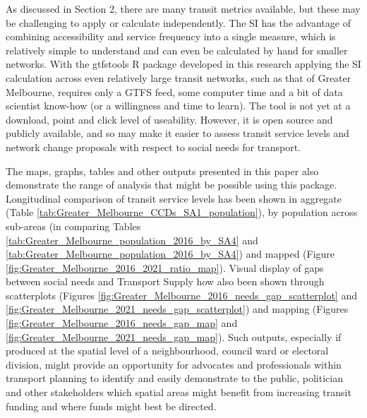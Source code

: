 \documentclass[preprint, 3p,
authoryear]{elsarticle} %
\begin{document}
As discussed in Section 2, there are many transit metrics available, but
these may be challenging to apply or calculate independently. The SI has
the advantage of combining accessibility and service frequency into a
single measure, which is relatively simple to understand and can even be
calculated by hand for smaller networks. With the gtfstools R package
developed in this research applying the SI calculation across even
relatively large transit networks, such as that of Greater Melbourne,
requires only a GTFS feed, some computer time and a bit of data
scientist know-how (or a willingness and time to learn). The tool is not
yet at a download, point and click level of useability. However, it is
open source and publicly available, and so may make it easier to assess
transit service levels and network change proposals with respect to
social needs for transport.

The maps, graphs, tables and other outputs presented in this paper also
demonstrate the range of analysis that might be possible using this
package. Longitudinal comparison of transit service levels has been
shown in aggregate (Table
\ref{tab:Greater_Melbourne_CCDs_SA1_population}), by population across
sub-areas (in comparing Tables
\ref{tab:Greater_Melbourne_population_2016_by_SA4} and
\ref{tab:Greater_Melbourne_population_2016_by_SA4}) and mapped (Figure
\ref{fig:Greater_Melbourne_2016_2021_ratio_map}). Visual display of gaps
between social needs and Transport Supply how also been shown through
scatterplots (Figures
\ref{fig:Greater_Melbourne_2016_needs_gap_scatterplot} and
\ref{fig:Greater_Melbourne_2021_needs_gap_scatterplot}) and mapping
(Figures \ref{fig:Greater_Melbourne_2016_needs_gap_map} and
\ref{fig:Greater_Melbourne_2021_needs_gap_map}). Such outputs,
especially if produced at the spatial level of a neighbourhood, council
ward or electoral division, might provide an opportunity for advocates
and professionals within transport planning to identify and easily
demonstrate to the public, politician and other stakeholders which
spatial areas might benefit from increasing transit funding and where
funds might best be directed.
\end{document}
